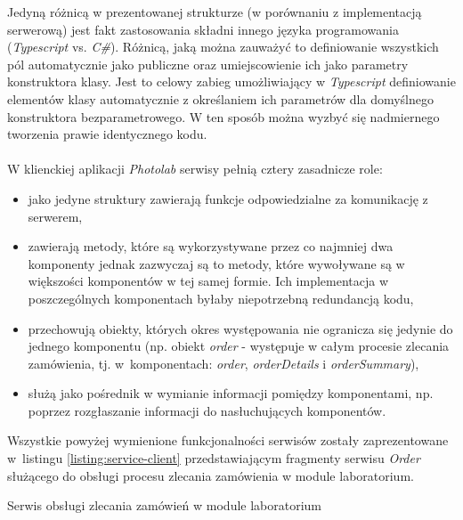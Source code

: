 \noindent Jedyną różnicą w prezentowanej strukturze (w porównaniu z implementacją serwerową) jest fakt zastosowania składni innego języka programowania (\textit{Typescript} vs. \textit{C\#}). Różnicą, jaką można zauważyć to definiowanie wszystkich pól automatycznie jako publiczne oraz umiejscowienie ich jako parametry konstruktora klasy. Jest to celowy zabieg umożliwiający w \textit{Typescript}  definiowanie elementów klasy automatycznie z określaniem ich parametrów dla domyślnego konstruktora bezparametrowego. W ten sposób można wyzbyć się nadmiernego tworzenia prawie identycznego kodu.\\
\\
\noindent W klienckiej aplikacji \textit{Photolab} serwisy pełnią cztery zasadnicze role:
\begin{itemize}
    \item jako jedyne struktury zawierają funkcje odpowiedzialne za komunikację z serwerem,
    \item zawierają metody, które są wykorzystywane przez co najmniej dwa komponenty jednak zazwyczaj są to metody, które wywoływane są w większości komponentów w tej samej formie. Ich implementacja w poszczególnych komponentach byłaby niepotrzebną redundancją kodu,
    \item przechowują obiekty, których okres występowania nie ogranicza się jedynie do jednego komponentu (np. obiekt \textit{order} - występuje w całym procesie zlecania zamówienia, tj. w~komponentach: \textit{order}, \textit{orderDetails} i \textit{orderSummary}),
    \item służą jako pośrednik w wymianie informacji pomiędzy komponentami, np. poprzez rozgłaszanie informacji do nasłuchujących komponentów.
\end{itemize}

\noindent Wszystkie powyżej wymienione funkcjonalności serwisów zostały zaprezentowane w~listingu \ref{listing:service-client} przedstawiającym fragmenty serwisu \textit{Order} służącego do obsługi procesu zlecania zamówienia w module laboratorium.

\begin{listing}[ht]
    \caption{Serwis obsługi zlecania zamówień w module laboratorium}
    \label{listing:service-client}
\end{listing}

